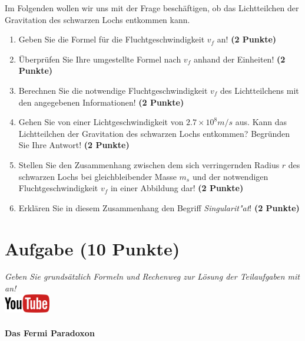 \documentclass[a4paper, 10pt]{scrartcl}\usepackage[]{graphicx}\usepackage[]{xcolor}
\begin{document}
Im Folgenden wollen wir uns mit der Frage besch{\"a}ftigen, ob das
Lichtteilchen der Gravitation des schwarzen Lochs entkommen kann.

\begin{enumerate}
\item Geben Sie die Formel f{\"u}r die Fluchtgeschwindigkeit $v_f$ an! 
  \textbf{(2 Punkte)}
\item {\"U}berpr{\"u}fen Sie Ihre umgestellte Formel nach $v_f$ anhand der Einheiten!
  \textbf{(2 Punkte)} 
\item Berechnen Sie die notwendige Fluchtgeschwindigkeit $v_f$ des
  Lichtteilchens mit den angegebenen Informationen! \textbf{(2 Punkte)}
\item Gehen Sie von einer Lichtgeschwindigkeit von $\ensuremath{2.7\times 10^{8}}m/s$
  aus. Kann das Lichtteilchen der Gravitation des schwarzen Lochs
  entkommen? Begr{\"u}nden Sie Ihre Antwort! \textbf{(2 Punkte)}
\item Stellen Sie den Zusammenhang zwischen dem sich verringernden Radius
  $r$ des schwarzen Lochs bei gleichbleibender Masse $m_s$
  und der notwendigen Fluchtgeschwindigkeit $v_f$ in einer Abbildung dar!
  \textbf{(2 Punkte)}
\item Erkl{\"a}ren Sie in diesem Zusammenhang den Begriff
  \textit{Singularit{"a}t}! \textbf{(2 Punkte)} 
\end{enumerate}


\clearpage\null 
\clearpage

\section{Aufgabe \hfill (10 Punkte)}

\textit{Geben Sie grunds{\"a}tzlich Formeln und Rechenweg zur L{\"o}sung der
  Teilaufgaben mit an!} \\[1Ex]

\hfill\href{https://youtu.be/-b4IRu2-EJo}{\includegraphics[width =
  2cm]{img/youtube}} %
\hspace{2Ex}

\paragraph{Das Fermi Paradoxon}
\end{document}
